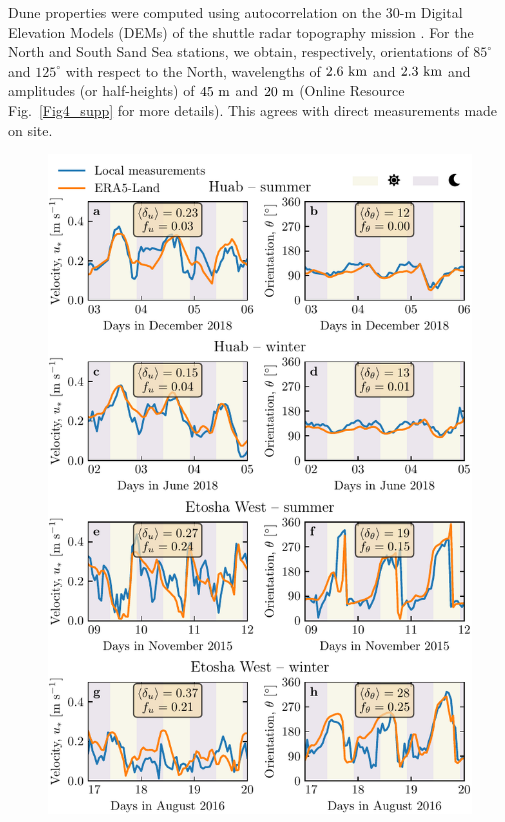 Dune properties were computed using autocorrelation on the 30-m Digital Elevation Models (DEMs) of the shuttle radar topography mission \citep{Farr2007}. For the North and South Sand Sea stations, we obtain, respectively, orientations of $85^\circ$ and $125^\circ$ with respect to the North, wavelengths of $2.6~\textup{km}$ and $2.3~\textup{km}$ and amplitudes (or half-heights) of $45~\textup{m}$ and $20~\textup{m}$ (Online Resource Fig.~\ref{Fig4_supp} for more details). This agrees with direct measurements made on site.


\begin{figure}
\centering
\includegraphics[scale=1]{Figures/Figure3.pdf}

\end{figure}
